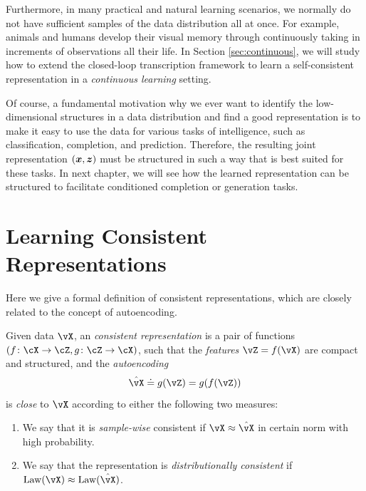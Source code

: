 \documentclass[../../book-main.tex]{subfiles}
\begin{document}
Furthermore, in many practical and natural learning scenarios, we normally do not have sufficient samples of the data distribution all at once. For example, animals and humans develop their visual memory through continuously taking in increments of observations all their life. In Section \ref{sec:continuous}, we will study how to extend the closed-loop transcription framework to learn a self-consistent representation in a  {\em continuous learning} setting.

Of course, a fundamental motivation why we ever want to identify the
low-dimensional structures in a data distribution and find a good
representation is to make it easy to use the data for various tasks
of intelligence, such as classification, completion, and prediction.
Therefore, the resulting joint representation $(\bm{x}, \bm{z})$ must be
structured in such a way that is best suited for these tasks. In
next chapter, we will
see how the learned representation can be structured to facilitate
conditioned completion or generation tasks.

\section{Learning Consistent Representations}\label{sec:consistent-representation}

Here we give a formal definition of consistent representations, which
are closely related to the concept of autoencoding. %
\begin{definition}\label{def:bidirectional_rep}
  Given data \(\vX\), an \textit{consistent representation} is a pair
  of functions \((f \colon \cX \to \cZ, g \colon \cZ \to \cX)\), such
  that the \textit{features} \(\vZ = f(\vX)\) are compact and
  structured, and the \textit{autoencoding} \[\hat{\vX} \doteq g(\vZ)
  = g(f(\vZ))\] is \textit{close} to \(\vX\) according to either the
  following two measures:
  \begin{enumerate}
    \item We say that it is \textit{sample-wise} consistent if \(\vX
      \approx \hat{\vX}\) in certain norm with high probability.
    \item We say that the representation is \textit{distributionally
      consistent} if \(\Law(\vX) \approx \Law(\hat{\vX})\).
  \end{enumerate}
\end{definition}
\end{document}
